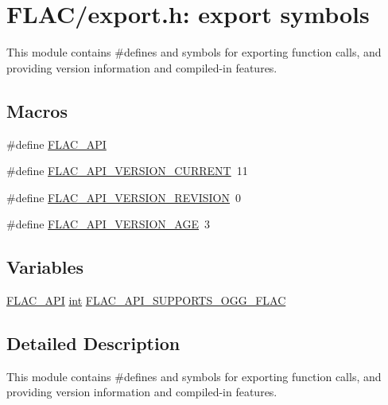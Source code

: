 \hypertarget{group__flac__export}{}\section{F\+L\+A\+C/export.h\+: export symbols}
\label{group__flac__export}


This module contains \#defines and symbols for exporting function calls, and providing version information and compiled-\/in features.  


\subsection*{Macros}
\begin{DoxyCompactItemize}
\item 
\#define \hyperlink{group__flac__export_ga56ca07df8a23310707732b1c0007d6f5}{F\+L\+A\+C\+\_\+\+A\+PI}
\item 
\#define \hyperlink{group__flac__export_ga31180fe15eea416cd8957cfca1a4c4f8}{F\+L\+A\+C\+\_\+\+A\+P\+I\+\_\+\+V\+E\+R\+S\+I\+O\+N\+\_\+\+C\+U\+R\+R\+E\+NT}~11
\item 
\#define \hyperlink{group__flac__export_ga811641dd9f8c542d9260240e7fbe8e93}{F\+L\+A\+C\+\_\+\+A\+P\+I\+\_\+\+V\+E\+R\+S\+I\+O\+N\+\_\+\+R\+E\+V\+I\+S\+I\+ON}~0
\item 
\#define \hyperlink{group__flac__export_ga1add3e09c8dfd57e8c921f299f0bbec1}{F\+L\+A\+C\+\_\+\+A\+P\+I\+\_\+\+V\+E\+R\+S\+I\+O\+N\+\_\+\+A\+GE}~3
\end{DoxyCompactItemize}
\subsection*{Variables}
\begin{DoxyCompactItemize}
\item 
\hyperlink{group__flac__export_ga56ca07df8a23310707732b1c0007d6f5}{F\+L\+A\+C\+\_\+\+A\+PI} \hyperlink{xmltok_8h_a5a0d4a5641ce434f1d23533f2b2e6653}{int} \hyperlink{group__flac__export_gaf762876dd61fbf2da1bef49762900533}{F\+L\+A\+C\+\_\+\+A\+P\+I\+\_\+\+S\+U\+P\+P\+O\+R\+T\+S\+\_\+\+O\+G\+G\+\_\+\+F\+L\+AC}
\end{DoxyCompactItemize}


\subsection{Detailed Description}
This module contains \#defines and symbols for exporting function calls, and providing version information and compiled-\/in features. 

